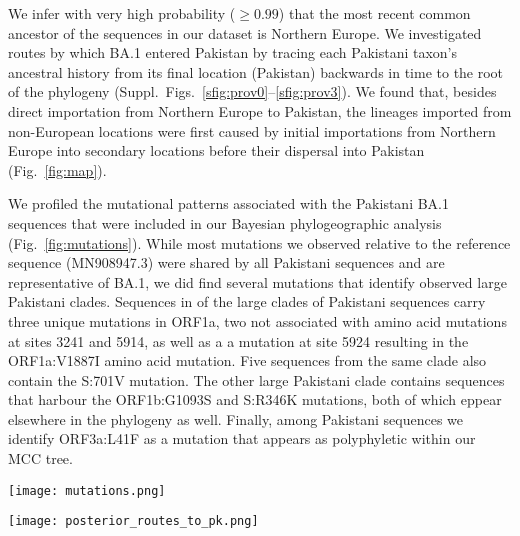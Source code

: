 We infer with very high probability ($ \geq 0.99$) that the most recent common ancestor of the sequences in our dataset is Northern Europe.
We investigated routes by which BA.1 entered Pakistan by tracing each Pakistani taxon's ancestral history from its final location (Pakistan) backwards in time to the root of the phylogeny (Suppl.~Figs.~\ref{sfig:prov0}--\ref{sfig:prov3}).
We found that, besides direct importation from Northern Europe to Pakistan, the lineages imported from non-European locations were first caused by initial importations from Northern Europe into secondary locations before their dispersal into Pakistan (Fig.~\ref{fig:map}).

We profiled the mutational patterns associated with the Pakistani BA.1 sequences that were included in our Bayesian phylogeographic analysis (Fig.~\ref{fig:mutations}).
While most mutations we observed relative to the reference sequence (MN908947.3) were shared by all Pakistani sequences and are representative of BA.1, we did find several mutations that identify observed large Pakistani clades.
Sequences in of the large clades of Pakistani sequences carry three unique mutations in ORF1a, two not associated with amino acid mutations at sites 3241 and 5914, as well as a a mutation at site 5924 resulting in the ORF1a:V1887I amino acid mutation.
Five sequences from the same clade also contain the S:701V mutation.
The other large Pakistani clade contains sequences that harbour the ORF1b:G1093S and S:R346K mutations, both of which eppear elsewhere in the phylogeny as well.
Finally, among Pakistani sequences we identify ORF3a:L41F as a mutation that appears as polyphyletic within our MCC tree. 


\begin{figure*}[!ht]
    \centering
    \texttt{[image: mutations.png]}
    \caption[Key mutations in Pakistan BA.1 dataset]{Condensed alignment of SARS-CoV-2 BA.1 sequences from Pakistan showing sites that are polymorphic within the Pakistan BA.1 dataset and shared by at least two sequences from Pakistan. The tree on the right is based on the MCC tree but is reduced down to just the BA.1 sequences from Pakistan while preserving their relative phylogenetic positions.}
    \label{fig:mutations}
\end{figure*}

\begin{figure*}[ht]
   \centering
   \texttt{[image: posterior\_routes\_to\_pk.png]}
    \caption[Pakistan BA.1 map]{Map representing routes by which BA.1 is inferred to enter Pakistan tracing from the most recent common ancestor of our dataset to Pakistani taxa. Inferred migration events that lead directly into Pakistan are represented in dark red, while migrations to a location other than Pakistan that then seed a downstream importation to Pakistan (indirect importations) are illustrated in lighter red.}
    \label{fig:map}
\end{figure*}


